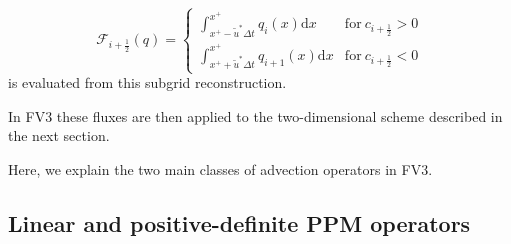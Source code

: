 \documentclass[10pt,letterpaper,margin=1in]{memoir}
\newcommand{\half}{\frac{1}{2}}
\begin{document}
\begin{enumerate}
  \begin{equation}  \label{eqn:fluxintegral}
  \mathcal{F}_{i+\half}(q) =
  \begin{cases}
    \int_{x^+ - \widetilde{u}^*\Delta t}^{x^+} q_{i}(x) \mathrm{d}x & \mathrm{for\ }c_{i+\half} > 0 \\
    \int_{x^+ + \widetilde{u}^*\Delta t}^{x^+} q_{i+1}(x) \mathrm{d}x & \mathrm{for\ }c_{i+\half} < 0
  \end{cases}
  \end{equation}
  is evaluated from this subgrid reconstruction. 
\end{enumerate}
In FV3 these fluxes are then applied to the two-dimensional \citet{PL07} scheme described in the next section. 

Here, we explain the two main classes of advection operators in FV3. 

\subsection{Linear and positive-definite PPM operators}\label{subsec:linearPPM}
\end{document}

